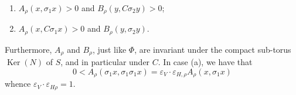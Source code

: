     
 \begin{enumerate}
      
 \item[(a)]
        \(A_\rho (x,\sigma _1x)>0\) and \(B_\rho (y,C\sigma _2y)>0\);
      

      
 \item[(b)]
        \(A_\rho (x,C\sigma _1x)>0\) and \(B_\rho (y,\sigma _2y)\).
      

    \end{enumerate}\par{}Furthermore, \(A_\rho \) and \(B_\rho \), just like \(\Phi \), are invariant under the compact sub-torus \(\operatorname {Ker}(N)\) of \(S\), and in particular under \(C\).
    In case (a), we have that
    \[       0       < A_\rho (\sigma _1x,\sigma _1\sigma _1x)       = \varepsilon _V\cdot \varepsilon _{H,\rho }A_\rho (x,\sigma _1x)     \]
    whence \(\varepsilon _V\cdot \varepsilon _{H\rho }=1\).
